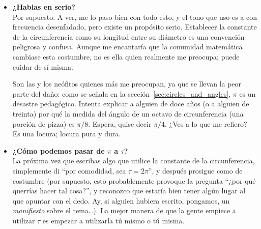 \begin{itemize}

  \item \textbf{¿Hablas en serio?} \\ Por supuesto. A ver, me lo paso bien con todo esto, y el tono que uso es a con frecuencia desenfadado, pero existe un propósito serio. Establecer la constante de la circunferencia como su longitud entre su diámetro es una convención peligrosa y confusa. Aunque me encantaría que la comunidad matemática cambiase esta costumbre, no es ella quien realmente me preocupa; puede cuidar de sí misma. 

Son las y los neófitos quienes más me preocupan, ya que se llevan la peor parte del daño: como se señala en la sección~\ref{sec:circles_and_angles}, $\pi$ es un desastre pedagógico. Intenta explicar a alguien de doce años (o a alguien de treinta) por qué la medida del ángulo de un octavo de circunferencia (una porción de pizza) es $\pi/8$. Espera, quise decir $\pi/4$. ¿Ves a lo que me refiero? Es una locura; locura pura y dura.
     

  \item \textbf{¿Cómo podemos pasar de $\pi$ a $\tau$?} \\ La próxima vez que escribas algo que utilice la constante de la circunferencia, simplemente di ``por comodidad, sea $\tau = 2\pi$'', y después prosigue como de costumbre (por supuesto, esto probablemente provoque la pregunta ``¿por qué querrías hacer tal cosa?'', y reconozco que estaría bien tener algún lugar al que apuntar con el dedo. Ay, si alguien hubiera escrito, pongamos, un \emph{manifiesto} sobre el tema\ldots). La mejor manera de que la gente empiece a utilizar $\tau$ es empezar a utilizarla tú mismo o tú misma.



\end{itemize}
